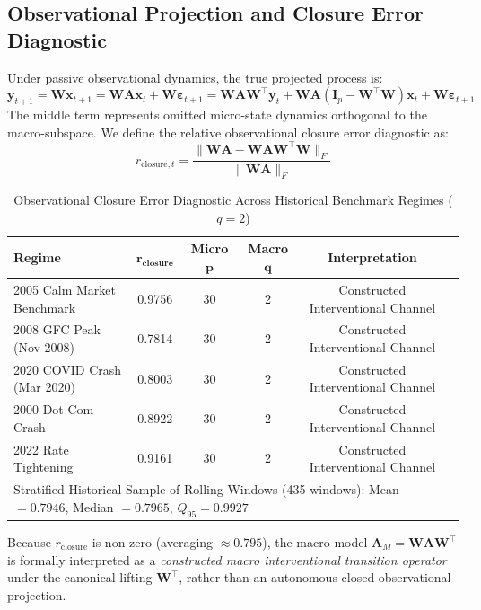 \documentclass[12pt]{article}
\begin{document}
\subsection{Observational Projection and Closure Error Diagnostic}
Under passive observational dynamics, the true projected process is:
\begin{equation}
\mathbf{y}_{t+1} = \mathbf{W}\mathbf{x}_{t+1} = \mathbf{W}\mathbf{A}\mathbf{x}_t + \mathbf{W}\boldsymbol{\varepsilon}_{t+1} = \mathbf{W}\mathbf{A}\mathbf{W}^\top \mathbf{y}_t + \mathbf{W}\mathbf{A}(\mathbf{I}_p - \mathbf{W}^\top \mathbf{W})\mathbf{x}_t + \mathbf{W}\boldsymbol{\varepsilon}_{t+1}
\end{equation}
The middle term represents omitted micro-state dynamics orthogonal to the macro-subspace. We define the relative observational closure error diagnostic as:
\begin{equation}
r_{\text{closure},t} = \frac{\|\mathbf{W}\mathbf{A} - \mathbf{W}\mathbf{A}\mathbf{W}^\top \mathbf{W}\|_F}{\|\mathbf{W}\mathbf{A}\|_F}
\end{equation}

\begin{table}[htbp]
\centering
\caption{Observational Closure Error Diagnostic Across Historical Benchmark Regimes ($q=2$)}
\label{tab:app_closure}
\begin{tabular}{lccccc}
\toprule
\textbf{Regime} & $\mathbf{r_{\text{closure}}}$ & \textbf{Micro } $\mathbf{p}$ & \textbf{Macro } $\mathbf{q}$ & \textbf{Interpretation} \\
\midrule
2005 Calm Market Benchmark & 0.9756 & 30 & 2 & Constructed Interventional Channel \\
2008 GFC Peak (Nov 2008)   & 0.7814 & 30 & 2 & Constructed Interventional Channel \\
2020 COVID Crash (Mar 2020) & 0.8003 & 30 & 2 & Constructed Interventional Channel \\
2000 Dot-Com Crash         & 0.8922 & 30 & 2 & Constructed Interventional Channel \\
2022 Rate Tightening       & 0.9161 & 30 & 2 & Constructed Interventional Channel \\
\midrule
\multicolumn{5}{l}{Stratified Historical Sample of Rolling Windows (435 windows): Mean $= 0.7946$, Median $= 0.7965$, $Q_{95} = 0.9927$} \\
\bottomrule
\end{tabular}
\end{table}

Because $r_{\text{closure}}$ is non-zero (averaging $\approx 0.795$), the macro model $\mathbf{A}_M = \mathbf{W}\mathbf{A}\mathbf{W}^\top$ is formally interpreted as a \emph{constructed macro interventional transition operator} under the canonical lifting $\mathbf{W}^\top$, rather than an autonomous closed observational projection.
\end{document}
